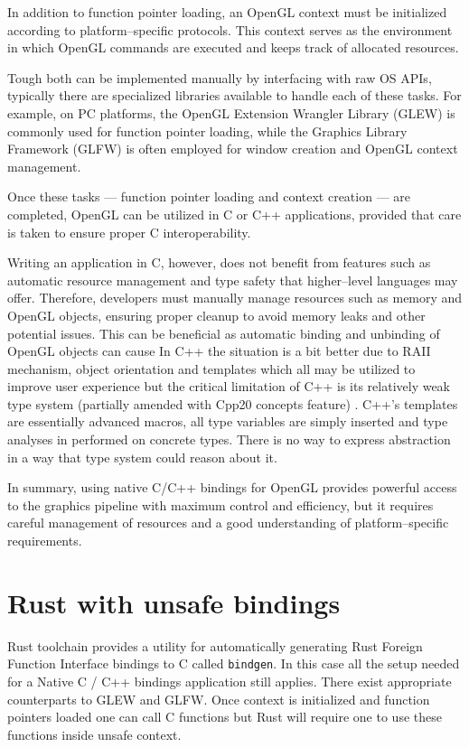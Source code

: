 In addition to function pointer loading, an OpenGL context must be initialized according to platform--specific protocols. 
This context serves as the environment in which OpenGL commands are executed and keeps track of allocated resources.

Tough both can be implemented manually by interfacing with raw OS APIs, typically there are specialized libraries available to handle each of these tasks.
For example, on PC platforms, the OpenGL Extension Wrangler Library (GLEW) \cite{glewwebiste} is commonly used for function pointer loading, 
while the Graphics Library Framework (GLFW) \cite{glfwwebiste} is often employed for window creation and OpenGL context management.

Once these tasks --- function pointer loading and context creation --- are completed, OpenGL can be utilized in C or C++ applications, provided that care is taken to ensure proper C interoperability. 

Writing an application in C, however, does not benefit from features such as automatic resource management and type safety that higher--level languages may offer.
Therefore, developers must manually manage resources such as memory and OpenGL objects, ensuring proper cleanup to avoid memory leaks and other potential issues.
This can be beneficial as automatic binding and unbinding of OpenGL objects can cause 
In C++ the situation is a bit better due to RAII mechanism, object orientation and templates which all may be utilized to improve user experience but the
critical limitation of C++ is its relatively weak type system (partially amended with Cpp20 concepts feature) \cite{cppref}.
C++'s templates are essentially advanced macros, all type variables are simply inserted and type analyses in performed on concrete types.
There is no way to express abstraction in a way that type system could reason about it.


In summary, using native C/C++ bindings for OpenGL provides powerful access to the graphics pipeline with maximum control and efficiency, 
but it requires careful management of resources and a good understanding of platform--specific requirements.

\section{Rust with unsafe bindings}

Rust toolchain provides a utility for automatically generating Rust Foreign Function Interface bindings to C called \texttt{bindgen}.
In this case all the setup needed for a Native C / C++ bindings application still applies. There exist appropriate counterparts to GLEW and GLFW.
Once context is initialized and function pointers loaded one can call C functions but Rust will require one to use these functions inside unsafe context.


